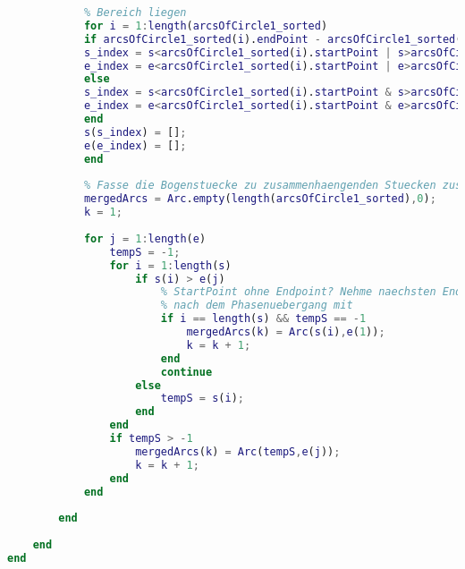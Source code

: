 \begin{lstlisting}[language=MATLAB, caption=Verfeinerung der lokalen Minima, label=lst:CircumferenceCalculation]
            % Entferne diejenigen Start- und Entpunkte, die im ueberlappten
            % Bereich liegen
            for i = 1:length(arcsOfCircle1_sorted)
            if arcsOfCircle1_sorted(i).endPoint - arcsOfCircle1_sorted(i).startPoint > 0
            s_index = s<arcsOfCircle1_sorted(i).startPoint | s>arcsOfCircle1_sorted(i).endPoint;
            e_index = e<arcsOfCircle1_sorted(i).startPoint | e>arcsOfCircle1_sorted(i).endPoint;
            else
            s_index = s<arcsOfCircle1_sorted(i).startPoint & s>arcsOfCircle1_sorted(i).endPoint;
            e_index = e<arcsOfCircle1_sorted(i).startPoint & e>arcsOfCircle1_sorted(i).endPoint;
            end
            s(s_index) = [];
            e(e_index) = [];
            end
            
            % Fasse die Bogenstuecke zu zusammenhaengenden Stuecken zusammen
            mergedArcs = Arc.empty(length(arcsOfCircle1_sorted),0);
            k = 1;
            
            for j = 1:length(e)
                tempS = -1;
                for i = 1:length(s)
                    if s(i) > e(j)
                        % StartPoint ohne Endpoint? Nehme naechsten Endpoint
                        % nach dem Phasenuebergang mit
                        if i == length(s) && tempS == -1 
                            mergedArcs(k) = Arc(s(i),e(1));
                            k = k + 1;
                        end
                        continue
                    else
                        tempS = s(i);
                    end
                end
                if tempS > -1
                    mergedArcs(k) = Arc(tempS,e(j));
                    k = k + 1;
                end     
            end
            
        end
        
    end
end
\end{lstlisting}